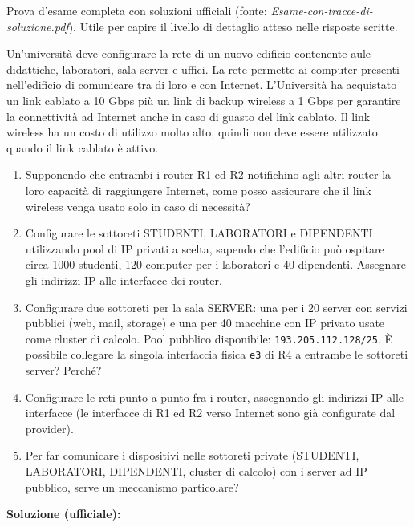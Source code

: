 \documentclass[12pt, a4paper]{article}
\begin{document}
Prova d'esame completa con soluzioni ufficiali (fonte: \textit{Esame-con-tracce-di-soluzione.pdf}). Utile per capire il livello di dettaglio atteso nelle risposte scritte.

\begin{tcolorbox}[colback=lightergray!10, colframe=tocsec, title=\textbf{Esercizio 1 (Configurazione di una rete locale) --- AA 2018/19}]
Un'università deve configurare la rete di un nuovo edificio contenente aule didattiche, laboratori, sala server e uffici. La rete permette ai computer presenti nell'edificio di comunicare tra di loro e con Internet. L'Università ha acquistato un link cablato a 10 Gbps più un link di backup wireless a 1 Gbps per garantire la connettività ad Internet anche in caso di guasto del link cablato. Il link wireless ha un costo di utilizzo molto alto, quindi non deve essere utilizzato quando il link cablato è attivo.

\begin{enumerate}
    \item Supponendo che entrambi i router R1 ed R2 notifichino agli altri router la loro capacità di raggiungere Internet, come posso assicurare che il link wireless venga usato solo in caso di necessità?
    \item Configurare le sottoreti STUDENTI, LABORATORI e DIPENDENTI utilizzando pool di IP privati a scelta, sapendo che l'edificio può ospitare circa 1000 studenti, 120 computer per i laboratori e 40 dipendenti. Assegnare gli indirizzi IP alle interfacce dei router.
    \item Configurare due sottoreti per la sala SERVER: una per i 20 server con servizi pubblici (web, mail, storage) e una per 40 macchine con IP privato usate come cluster di calcolo. Pool pubblico disponibile: \texttt{193.205.112.128/25}. È possibile collegare la singola interfaccia fisica \texttt{e3} di R4 a entrambe le sottoreti server? Perché?
    \item Configurare le reti punto-a-punto fra i router, assegnando gli indirizzi IP alle interfacce (le interfacce di R1 ed R2 verso Internet sono già configurate dal provider).
    \item Per far comunicare i dispositivi nelle sottoreti private (STUDENTI, LABORATORI, DIPENDENTI, cluster di calcolo) con i server ad IP pubblico, serve un meccanismo particolare?
\end{enumerate}
\end{tcolorbox}

\textbf{Soluzione (ufficiale):}
\end{document}
